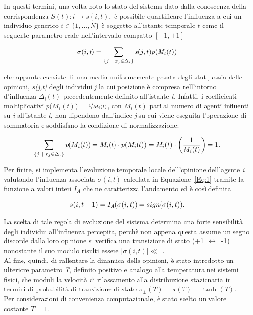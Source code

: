 \documentclass{article}
\begin{document}
In questi termini, una volta noto lo stato del sistema dato dalla conoscenza della corrispondenza $S(t): i \rightarrow s(i,t), $ è possibile quantificare l'influenza a cui un individuo generico $\textit{i} \in \{1,...,\textit{N} \}$ è soggetto all'istante temporale $\textit{t}$ come il seguente parametro reale nell'intervallo compatto $[-1,+1]$

\begin{equation}
    \sigma(i,t) = \sum_{ \{ j \ | \ x_{j} \in \Delta_{i} \} } s(j, t)p(M_{i}(t))
    \medskip
    \label{Eq:1}
\end{equation}

che appunto consiste di una media uniformemente pesata degli stati, ossia delle opinioni, \textit{s(j,t)} degli individui \textit{j} la cui posizione è compresa nell'intorno d'influenza $\Delta_{i}(t)$ precedentemente definito all'istante \textit{t}. Infatti, i coefficienti moltiplicativi \textit{p}($M_{i}(t)$) = $\nicefrac{1}{M_{i}(t)}$, con $M_{i}(t)$ pari al numero di agenti influenti su \textit{i} all'istante \textit{t}, non dipendono dall'indice \textit{j} su cui viene eseguita l'operazione di sommatoria e soddisfano la condizione di normalizzazione:

\begin{equation}
    \sum_{ \{ j \ | \ x_{j} \in \Delta_{i} \} } p(M_{i}(t)) = M_{i}(t) \cdot p(M_{i}(t)) =    M_{i}(t) \cdot \left ( \frac{1}{M_{i}(t)} \right ) = 1.
    \medskip
    \label{Eq:2}
\end{equation}

Per finire, si implementa l'evoluzione temporale locale dell'opinione dell'agente \textit{i} valutando l'influenza associata $\sigma(i,t)$  calcolata in Equazione~\ref{Eq:1} tramite la funzione a valori interi $I_{A}$ che ne caratterizza l'andamento ed è così definita

\begin{equation}
    s(i,t+1) = I_A(\sigma(i,t)) = sign(\sigma(i,t)).
    \medskip
    \label{Eq:3}
\end{equation}

La scelta di tale regola di evoluzione del sistema determina una forte sensibilità degli individui all'influenza percepita, perchè non appena questa assume un segno discorde dalla loro opinione si verifica una transizione di stato \mbox{(+1 $\longleftrightarrow$ -1)} nonostante il suo modulo risulti essere $|\sigma(i,t)| \ll 1$.
\\ Al fine, quindi, di rallentare la dinamica delle opinioni, è stato introdotto un ulteriore parametro \textit{T}, definito positivo e analogo alla temperatura nei sistemi fisici, che moduli la velocità di rilassamento alla distribuzione stazionaria in termini di probabilità di transizione di stato $ \pi_{\pm}(T) = \pi(T) = \tanh (T)$.
\\ Per considerazioni di convenienza computazionale, è stato scelto un valore costante $T=1$.
\end{document}
